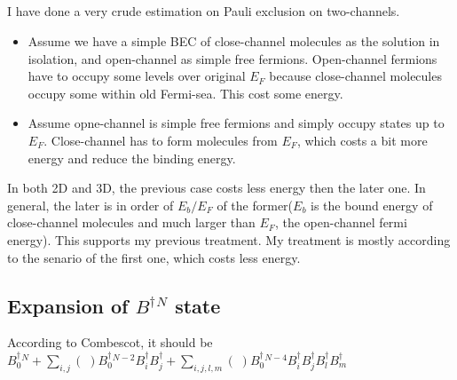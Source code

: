\subsection{}
I have done a very crude estimation on Pauli exclusion on two-channels.  

\begin{itemize}
	\item Assume we have a simple BEC of close-channel molecules as the solution in isolation, and open-channel as simple free fermions.  Open-channel fermions have to occupy some levels over original $E_F$ because close-channel molecules occupy some within old Fermi-sea. This cost some energy. 
	\item Assume opne-channel is simple free fermions and simply occupy states up to $E_F$. Close-channel has to form molecules from $E_F$, which costs a bit more energy and reduce the binding energy.  
\end{itemize}
In both 2D and 3D, the previous case costs less energy then the later one.  In general, the later is in order of $E_b/E_F$ of the former($E_b$ is the bound energy of close-channel molecules and much larger than $E_F$, the open-channel fermi energy).  This supports my previous treatment.  My treatment is mostly according to the senario of the first one, which costs less energy. 

\subsection{Expansion of $B^\dagger{}^N$ state}
According to Combescot, it should be $B_0^\dagger{}^N+\sum_{i,j}(\;)B_0^\dagger{}^{N-2}B_i^\dagger{}B_j^\dagger+\sum_{i,j,l,m}(\;)B_0^\dagger{}^{N-4}B_i^\dagger{}B_j^\dagger{}B_l^\dagger{}B_m^\dagger$